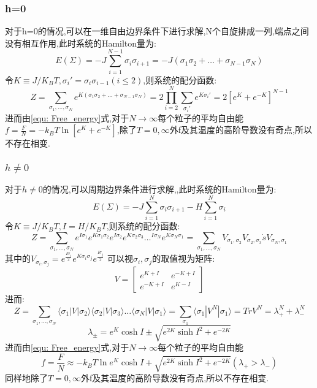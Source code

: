 \documentclass[12pt]{article} %
\begin{document}
\subsubsection{h=0}
对于h=0的情况,可以在一维自由边界条件下进行求解,N个自旋排成一列,端点之间没有相互作用,此时系统的Hamilton量为:
\begin{equation}
\label{equ: Hamilton_1D_H0}
E(\Sigma) = -J\sum_{i=1}^{N-1}\sigma_{i}\sigma_{i+1} = -J(\sigma_1\sigma_2+\dots+\sigma_{N-1}\sigma_N)
\end{equation}
令$K\equiv J/K_{B}T, \sigma_{i}'=\sigma_{i}\sigma_{i-1} (i\leq 2)$,则系统的配分函数:
\begin{equation}
\label{equ: Z_1D_H0}
Z = \sum_{\sigma_1,\dots,\sigma_N}e^{K(\sigma_1\sigma_2+\dots+\sigma_{N-1}\sigma_N)} = 2\prod_{i=2}^{N}\sum_{\sigma_{i}'}e^{K\sigma_{i}'} = 2[e^{K}+e^{-K}]^{N-1}
\end{equation}
进而由\eqref{equ: Free_energy}式,对于$N\rightarrow \infty$每个粒子的平均自由能$f = \frac{F}{N} = -k_{B}T\ln [e^{K}+e^{-K}]$,除了$T=0,\infty$外f及其温度的高阶导数没有奇点,所以不存在相变.

\subsubsection{$h\neq0$}
对于$h\neq0$的情况,可以周期边界条件进行求解,,此时系统的Hamilton量为:
\begin{equation}
\label{equ: Hamilton_1D_H}
E(\Sigma) = -J\sum_{i=1}^{N}\sigma_{i}\sigma_{i+1} - H\sum_{i=1}^{N}\sigma_i
\end{equation}
令$K\equiv J/K_{B}T, I = H/K_{B}T$,则系统的配分函数:
\begin{equation}
\label{equ: Z_1D_H}
Z = \sum_{\sigma_1,\dots,\sigma_N}e^{I\sigma_1}e^{K\sigma_1\sigma_2}e^{I\sigma_2}e^{K\sigma_2\sigma_3}\dots^{I\sigma_N}e^{K\sigma_N\sigma_1}
= \sum_{\sigma_1,\dots,\sigma_N}V_{\sigma_1,\sigma_2}V_{\sigma_2,\sigma_3}\dot sV_{\sigma_N,\sigma_1}
\end{equation}
其中的$V_{\sigma_i,\sigma_j} = e^{\frac{I\sigma_i}{2}}e^{K\sigma_i\sigma_j}e^{\frac{I\sigma_j}{2}}$ 可以视$\sigma_i,\sigma_j$的取值视为矩阵:
$$
V=
\left[
\begin{matrix}
    e^{K+I}&e^{-K+I} \\
    e^{-K+I}&e^{K-I}
\end{matrix}
\right]
 $$
进而:
$$Z = \sum_{\sigma_1,\dots,\sigma_N}\langle\sigma_1|V|\sigma_2\rangle\langle\sigma_2|V|\sigma_3\rangle\dots\langle\sigma_N|V|\sigma_1\rangle = \sum_{\sigma_1}\langle\sigma_1|V^{N}|\sigma_1\rangle = Tr V^N = \lambda_{+}^N+\lambda_{-}^N $$
$$\lambda_{\pm} = e^K\cosh I \pm \sqrt{e^{2K}\sinh{I}^2+e^{-2K}}$$
进而由\eqref{equ: Free_energy}式,对于$N\rightarrow \infty$每个粒子的平均自由能
$$f = \frac{F}{N} \approx -k_{B}T\ln e^K\cosh I + \sqrt{e^{2K}\sinh{I}^2+e^{-2K}} (\lambda_{+}>\lambda_{-})$$
同样地除了$T=0,\infty$外f及其温度的高阶导数没有奇点,所以不存在相变.
\end{document}
